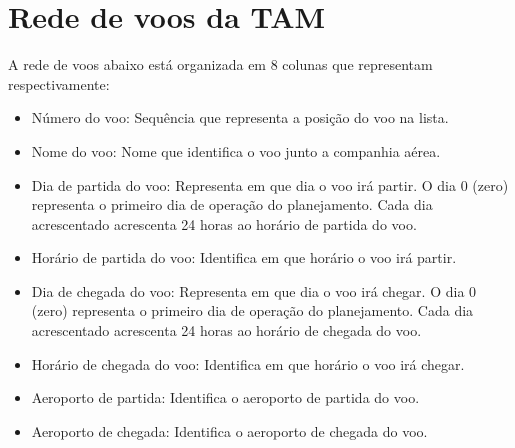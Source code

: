 \chapter{Rede de voos da TAM}\label{anx:nettam}

A rede de voos abaixo está organizada em 8 colunas que representam
respectivamente:

\begin{itemize}
  \item Número do voo: Sequência que representa a posição do voo na lista.
  \item Nome do voo: Nome que identifica o voo junto a companhia aérea.
  \item Dia de partida do voo: Representa em que dia o voo irá partir. O dia
  0 (zero) representa o primeiro dia de operação do planejamento. Cada dia
  acrescentado acrescenta 24 horas ao horário de partida do voo.
  \item Horário de partida do voo: Identifica em que horário o voo irá partir.
  \item Dia de chegada do voo: Representa em que dia o voo irá chegar. O dia
  0 (zero) representa o primeiro dia de operação do planejamento. Cada dia
  acrescentado acrescenta 24 horas ao horário de chegada do voo.
  \item Horário de chegada do voo: Identifica em que horário o voo irá chegar.
  \item Aeroporto de partida: Identifica o aeroporto de partida do voo.
  \item Aeroporto de chegada: Identifica o aeroporto de chegada do voo.
    
\end{itemize}

